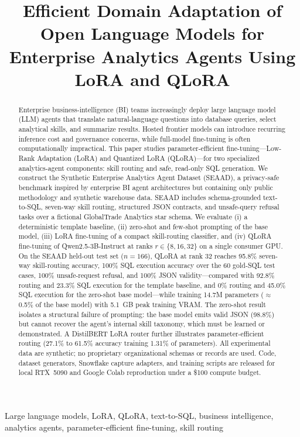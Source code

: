 \documentclass[conference]{IEEEtran}
\begin{document}
\title{Efficient Domain Adaptation of Open Language Models for Enterprise Analytics Agents Using LoRA and QLoRA}
\author{
}
\maketitle
\begin{abstract}
Enterprise business-intelligence (BI) teams increasingly deploy large language model (LLM) agents that translate natural-language questions into database queries, select analytical skills, and summarize results. Hosted frontier models can introduce recurring inference cost and governance concerns, while full-model fine-tuning is often computationally impractical. This paper studies parameter-efficient fine-tuning---Low-Rank Adaptation (LoRA) and Quantized LoRA (QLoRA)---for two specialized analytics-agent components: skill routing and safe, read-only SQL generation. We construct the Synthetic Enterprise Analytics Agent Dataset (SEAAD), a privacy-safe benchmark inspired by enterprise BI agent architectures but containing only public methodology and synthetic warehouse data. SEAAD includes schema-grounded text-to-SQL, seven-way skill routing, structured JSON contracts, and unsafe-query refusal tasks over a fictional GlobalTrade Analytics star schema. We evaluate (i) a deterministic template baseline, (ii) zero-shot and few-shot prompting of the base model, (iii) LoRA fine-tuning of a compact skill-routing classifier, and (iv) QLoRA fine-tuning of Qwen2.5-3B-Instruct at ranks $r\in\{8,16,32\}$ on a single consumer GPU. On the SEAAD held-out test set ($n{=}166$), QLoRA at rank 32 reaches 95.8\% seven-way skill-routing accuracy, 100\% SQL execution accuracy over the 60 gold-SQL test cases, 100\% unsafe-request refusal, and 100\% JSON validity---compared with 92.8\% routing and 23.3\% SQL execution for the template baseline, and 0\% routing and 45.0\% SQL execution for the zero-shot base model---while training 14.7M parameters ($\approx$0.5\% of the base model) with 5.1~GB peak training VRAM. The zero-shot result isolates a structural failure of prompting: the base model emits valid JSON (98.8\%) but cannot recover the agent's internal skill taxonomy, which must be learned or demonstrated. A DistilBERT LoRA router further illustrates parameter-efficient routing (27.1\% to 61.5\% accuracy training 1.31\% of parameters). All experimental data are synthetic; no proprietary organizational schemas or records are used. Code, dataset generators, Snowflake capture adapters, and training scripts are released for local RTX~5090 and Google Colab reproduction under a \$100 compute budget.
\end{abstract}
\begin{IEEEkeywords}
Large language models, LoRA, QLoRA, text-to-SQL, business intelligence, analytics agents, parameter-efficient fine-tuning, skill routing
\end{IEEEkeywords}
\end{document}
